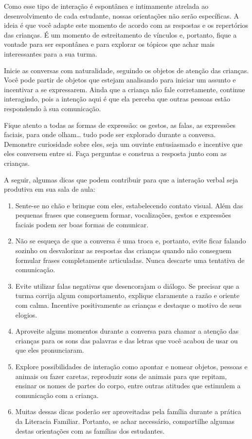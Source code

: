 \documentclass[11pt]{extarticle}
\begin{document}
Como esse tipo de interação é espontânea e intimamente atrelada ao 
desenvolvimento de cada estudante, nossas orientações não serão específicas. 
A ideia é que você adapte este momento de acordo com as respostas e os 
repertórios das crianças. É um momento de estreitamento de vínculos e, portanto, 
fique a vontade para ser espontânea e para explorar os tópicos que achar 
mais interessantes para a sua turma.

Inicie as conversas com naturalidade, seguindo os objetos de atenção das crianças. 
Você pode partir de objetos que estejam analisando
para iniciar um assunto e incentivar a se expressarem. Ainda
que a criança não fale corretamente, continue interagindo, pois a
intenção aqui é que ela perceba que outras pessoas estão respondendo à sua comunicação.

Fique atento a todas as formas de expressão: os gestos, as falas, as 
expressões faciais, para onde olham\ldots{} tudo pode ser explorado durante a conversa. 
Demonstre curiosidade sobre eles, seja um ouvinte entusiasmado e incentive que eles 
conversem entre si. Faça perguntas e construa a resposta junto com as crianças. 

A seguir, algumas dicas que podem contribuir para que a interação verbal 
seja produtiva em sua sala de aula: 

\begin{enumerate}
\item Sente-se no chão e brinque com eles, estabelecendo 
contato visual. Além das pequenas frases que conseguem formar,
vocalizações, gestos e expressões faciais podem ser boas formas
de comunicar.

\item Não se esqueça de que a conversa é uma troca e, portanto, evite
ficar falando sozinho ou desvalorizar as respostas das crianças
quando não conseguem formular frases completamente
articuladas. Nunca descarte uma tentativa de comunicação.

\item Evite utilizar falas negativas que desencorajam o diálogo. 
Se precisar que a turma 
corrija algum comportamento, explique claramente a razão e 
oriente com calma. Incentive positivamente as crianças e 
destaque o motivo de seus elogios. 

\item Aproveite alguns momentos durante a conversa para chamar 
a atenção das crianças para os sons das palavras e das letras que você 
acabou de usar ou que eles pronunciaram.  

\item Explore possibilidades de interação como apontar e 
nomear objetos, pessoas e animais ou fazer caretas, reproduzir sons de 
animais para que repitam, ensinar os nomes de partes do corpo, 
entre outras atitudes que estimulem a comunicação com a criança. 

\item Muitas dessas dicas poderão ser aproveitadas pela 
família durante a prática da Literacia Familiar. Portanto, 
se achar necessário, compartilhe algumas destas orientações 
com as famílias dos estudantes.
\end{enumerate}
\end{document}
